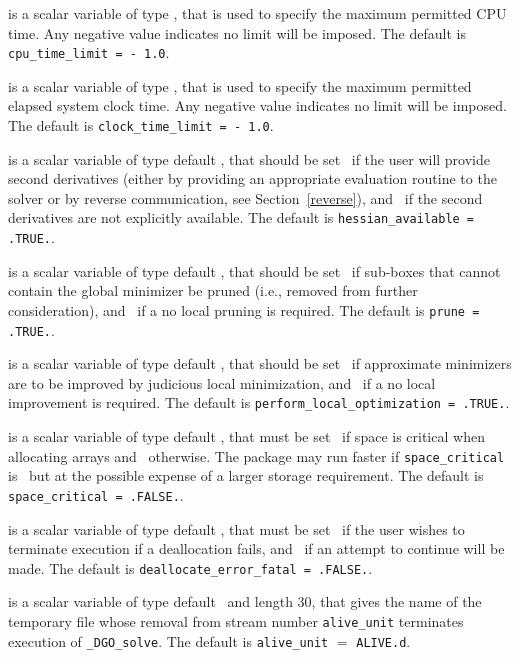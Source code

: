 \documentclass{galahad}
\newcommand{\packagename}{DGO}
\newcommand{\fullpackagename}{\libraryname\_\packagename}
\newcommand{\solver}{{\tt \fullpackagename\_solve}}
\begin{document}
\begin{description}
 is a scalar variable of type \realdp,
that is used to specify the maximum permitted CPU time. Any negative
value indicates no limit will be imposed. The default is
{\tt cpu\_time\_limit = - 1.0}.

 is a scalar variable of type \realdp,
that is used to specify the maximum permitted elapsed system clock time.
Any negative value indicates no limit will be imposed. The default is
{\tt clock\_time\_limit = - 1.0}.

is a scalar variable of type default \logical,
that should be set \true\ if the user will provide second derivatives
(either by providing an appropriate evaluation routine to the solver
or by reverse communication, see Section~\ref{reverse}), and
\false\ if the second derivatives are not explicitly available.
The default is {\tt hessian\_available = .TRUE.}.

is a scalar variable of type default \logical,
that should be set \true\ if sub-boxes that cannot contain the global 
minimizer be pruned (i.e.,  removed from further consideration),
and \false\ if a no local pruning is required.
The default is {\tt prune = .TRUE.}.

is a scalar variable of type default \logical,
that should be set \true\ if approximate minimizers are to 
be improved by judicious local minimization, 
and \false\ if a no local improvement is required.
The default is {\tt perform\_local\_optimization = .TRUE.}.

 is a scalar variable of type default \logical,
that must be set \true\ if space is critical when allocating arrays
and  \false\ otherwise. The package may run faster if
{\tt space\_critical} is \false\ but at the possible expense of a larger
storage requirement. The default is {\tt space\_critical = .FALSE.}.

 is a scalar variable of type default \logical,
that must be set \true\ if the user wishes to terminate execution if
a deallocation  fails, and \false\ if an attempt to continue
will be made. The default is {\tt deallocate\_error\_fatal = .FALSE.}.

 is a scalar variable of type default \character\ and length
30, that gives the name of the temporary file whose removal from stream number
{\tt alive\_unit} terminates execution of \solver.
The default is {\tt alive\_unit} $=$ {\tt ALIVE.d}.


\end{description}
\end{document}
